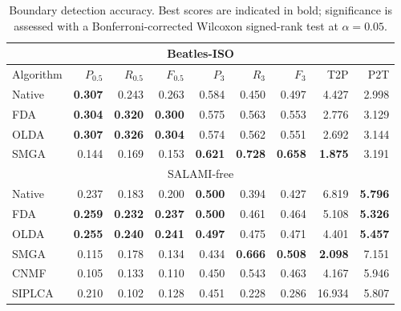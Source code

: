\begin{table*}
\centering
\caption{Boundary detection accuracy. Best scores are indicated in bold; significance is assessed with a Bonferroni-corrected Wilcoxon signed-rank test at $\alpha=0.05$.\label{tab:results}}
\begin{tabular}{lrrrrrrrr}
\multicolumn{9}{c}{Beatles-ISO}\\
\toprule%
Algorithm & $P_{0.5}$       & $R_{0.5}$         & $F_{0.5}$         & $P_3$             & $R_3$             & $F_3$             & T2P               & P2T\\
\hline
Native  & \textbf{0.307}    & 0.243             & 0.263             & 0.584             & 0.450             & 0.497             & 4.427             & 2.998\\
FDA     & \textbf{0.304}    & \textbf{0.320}    & \textbf{0.300}    & 0.575             & 0.563             & 0.553             & 2.776             & 3.129\\
OLDA    & \textbf{0.307}    & \textbf{0.326}    & \textbf{0.304}    & 0.574             & 0.562             & 0.551             & 2.692             & 3.144\\
\hline
SMGA    & 0.144             & 0.169             & 0.153             & \textbf{0.621}    & \textbf{0.728}    & \textbf{0.658}    & \textbf{1.875}    & 3.191\\
\toprule%
\multicolumn{9}{c}{SALAMI-free}\\
\hline
Native  & 0.237             & 0.183             & 0.200             & \textbf{0.500}    & 0.394             & 0.427             & 6.819             & \textbf{5.796}\\
FDA     & \textbf{0.259}    & \textbf{0.232}    & \textbf{0.237}    & \textbf{0.500}    & 0.461             & 0.464             & 5.108             & \textbf{5.326}\\
OLDA    & \textbf{0.255}    & \textbf{0.240}    & \textbf{0.241}    & \textbf{0.497}    & 0.475             & 0.471             & 4.401             & \textbf{5.457}\\
\hline
SMGA    & 0.115             & 0.178             & 0.134             & 0.434             & \textbf{0.666}    & \textbf{0.508}    & \textbf{2.098}    & 7.151\\
CNMF    & 0.105             & 0.133             & 0.110             & 0.450             & 0.543             & 0.463             & 4.167             & 5.946\\
SIPLCA  & 0.210             & 0.102             & 0.128             & 0.451             & 0.228             & 0.286             & 16.934            & 5.807\\
\bottomrule%
\end{tabular}
\end{table*}
